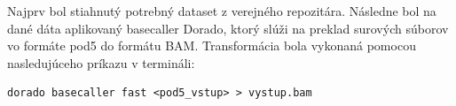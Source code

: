 Najprv bol stiahnutý potrebný dataset z verejného repozitára. %
Následne bol na dané dáta aplikovaný basecaller Dorado, ktorý slúži na preklad surových súborov vo formáte pod5 do formátu BAM.
Transformácia bola vykonaná pomocou nasledujúceho príkazu v termináli:
\begin{verbatim}
dorado basecaller fast <pod5_vstup> > vystup.bam
\end{verbatim}
